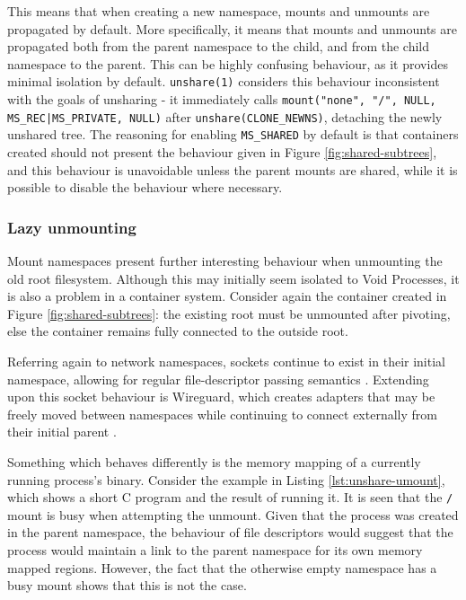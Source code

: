 \documentclass[sigplan]{acmart}
\begin{document}

This means that when creating a new namespace, mounts and unmounts are propagated by default. More specifically, it means that mounts and unmounts are propagated both from the parent namespace to the child, and from the child namespace to the parent. This can be highly confusing behaviour, as it provides minimal isolation by default. \texttt{unshare(1)} considers this behaviour inconsistent with the goals of unsharing - it immediately calls \texttt{mount("none", "/", NULL, MS\_REC|MS\_PRIVATE, NULL)} after \texttt{unshare(CLONE\_NEWNS)}, detaching the newly unshared tree. The reasoning for enabling \texttt{MS\_SHARED} by default is that containers created should not present the behaviour given in Figure \ref{fig:shared-subtrees}, and this behaviour is unavoidable unless the parent mounts are shared, while it is possible to disable the behaviour where necessary.

\subsubsection{Lazy unmounting}

Mount namespaces present further interesting behaviour when unmounting the old root filesystem. Although this may initially seem isolated to Void Processes, it is also a problem in a container system. Consider again the container created in Figure \ref{fig:shared-subtrees}: the existing root must be unmounted after pivoting, else the container remains fully connected to the outside root.

Referring again to network namespaces, sockets continue to exist in their initial namespace, allowing for regular file-descriptor passing semantics \citep{biederman_re_2007}. Extending upon this socket behaviour is Wireguard, which creates adapters that may be freely moved between namespaces while continuing to connect externally from their initial parent \citep[§7.3]{donenfeld_wireguard_2017}.

Something which behaves differently is the memory mapping of a currently running process's binary. Consider the example in Listing \ref{lst:unshare-umount}, which shows a short C program and the result of running it. It is seen that the \texttt{/} mount is busy when attempting the unmount. Given that the process was created in the parent namespace, the behaviour of file descriptors would suggest that the process would maintain a link to the parent namespace for its own memory mapped regions. However, the fact that the otherwise empty namespace has a busy mount shows that this is not the case.
\end{document}
